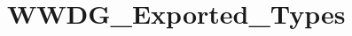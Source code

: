 \hypertarget{group__WWDG__Exported__Types}{
\section{WWDG\_\-Exported\_\-Types}
\label{group__WWDG__Exported__Types}
}
